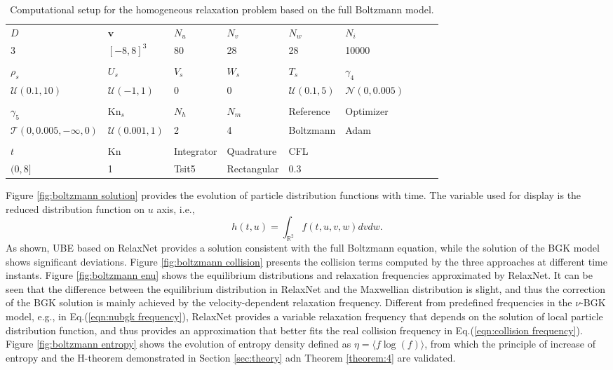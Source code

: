 \documentclass[preprint,3p,12pt,sort&compress]{elsarticle}
\begin{document}
\begin{table}[htbp]
	\caption{Computational setup for the homogeneous relaxation problem based on the full Boltzmann model.}
	\centering
	\begin{tabular}{lllllllll} 
	    \hline
	    $D$ & $\mathbf v$ & $N_u$ & $N_v$ & $N_w$ & $N_i$ & \\
	    3 & $[-8,8]^3$ & 80 & 28 & 28 & 10000 & \\
		\rule{0pt}{0ex}\\
		$\rho_s$ & $U_s$ & $V_s$ & $W_s$ & $T_s$ & $\gamma_4$ \\
		$\mathcal U(0.1,10)$ & $\mathcal U(-1,1)$ & $0$ & $0$ & $\mathcal U(0.1,5)$ & $\mathcal N(0,0.005)$ \\
		\rule{0pt}{0ex}\\
		$\gamma_5$ & $\mathrm{Kn}_s$ & $N_h$ & $N_m$ & Reference & Optimizer \\
	    $\mathcal T(0,0.005,-\infty,0)$ & $\mathcal U(0.001,1)$ & 2 & 4 & Boltzmann & Adam \\
		\rule{0pt}{0ex}\\
		$t$ & Kn & Integrator & Quadrature & CFL \\
		$(0,8]$ & 1 & Tsit5 & Rectangular & 0.3 \\
		\hline
	\end{tabular} 
	\label{tab:boltzmann}
\end{table}

Figure \ref{fig:boltzmann solution} provides the evolution of particle distribution functions with time.
The variable used for display is the reduced distribution function on $u$ axis, i.e.,
\begin{equation*}
    h(t,u) = \int_{\mathbb R^2} f(t,u,v,w) dvdw.
\end{equation*}
As shown, UBE based on RelaxNet provides a solution consistent with the full Boltzmann equation, while the solution of the BGK model shows significant deviations.
Figure \ref{fig:boltzmann collision} presents the collision terms computed by the three approaches at different time instants.
Figure \ref{fig:boltzmann enu} shows the equilibrium distributions and relaxation frequencies approximated by RelaxNet.
It can be seen that the difference between the equilibrium distribution in RelaxNet and the Maxwellian distribution is slight, and thus the correction of the BGK solution is mainly achieved by the velocity-dependent relaxation frequency.
Different from predefined frequencies in the $\nu$-BGK model, e.g., in Eq.(\ref{eqn:nubgk frequency}), RelaxNet provides a variable relaxation frequency that depends on the solution of local particle distribution function, and thus provides an approximation that better fits the real collision frequency in Eq.(\ref{eqn:collision frequency}).
Figure \ref{fig:boltzmann entropy} shows the evolution of entropy density defined as $\eta = \langle f\log(f) \rangle$, 
from which the principle of increase of entropy and the H-theorem demonstrated in Section \ref{sec:theory} adn Theorem \ref{theorem:4} are validated.
\end{document}
